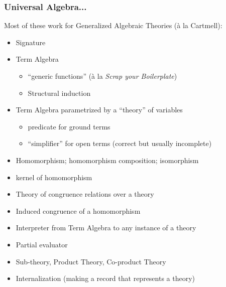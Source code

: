 \documentclass{beamer}
\newcommand{\sred}[1]{\textcolor{slidered}{#1}}
\begin{document}
\begin{frame}
\frametitle{Universal Algebra...}
Most of these work for Generalized Algebraic Theories (\`{a} la Cartmell):
\begin{itemize}
\item Signature
\item Term Algebra
\begin{itemize}
\item ``generic functions'' (\`{a} la \textit{Scrap your Boilerplate})
\item Structural induction
\end{itemize}
\item Term Algebra parametrized by a ``theory'' of variables
\begin{itemize}
\item predicate for ground terms
\item ``simplifier'' for open terms (correct but usually incomplete)
\end{itemize}
\item \sred{Homomorphism}; homomorphism composition; isomorphism
\item kernel of homomorphism
\item Theory of congruence relations over a theory
\item Induced congruence of a homomorphism 
\item Interpreter from Term Algebra to any instance of a theory
\item Partial evaluator
\item Sub-theory, Product Theory, Co-product Theory
\item Internalization (making a record that represents a theory)
\end{itemize}
\end{frame}
\end{document}
